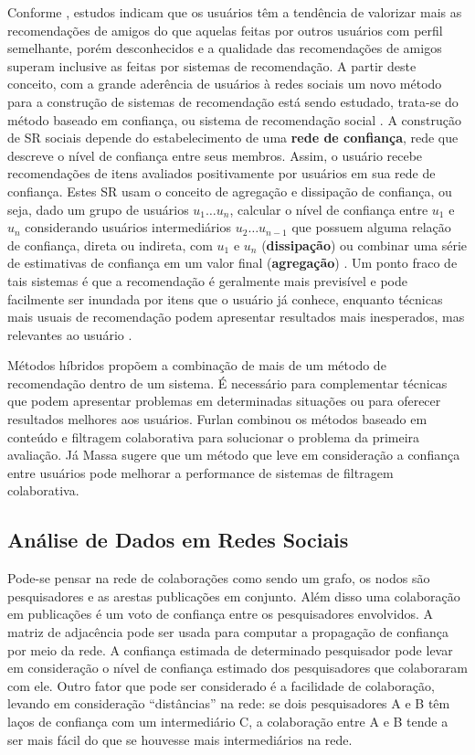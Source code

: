 \documentclass[12pt]{article}
\begin{document}
Conforme \cite{sinha2001comparing}, estudos indicam que os usuários têm a tendência de valorizar mais as recomendações de amigos do que aquelas feitas por outros usuários com perfil semelhante, porém desconhecidos e a qualidade das recomendações de amigos superam inclusive as feitas por sistemas de recomendação. A partir deste conceito, com a grande aderência de usuários à redes sociais um novo método para a construção de sistemas de recomendação está sendo estudado, trata-se do método baseado em confiança, ou sistema de recomendação social  \cite{ricci2011introduction}. A construção de SR sociais depende do estabelecimento de uma \textbf{rede de confiança}, rede que descreve o nível de confiança entre seus membros. Assim, o usuário recebe recomendações de itens avaliados positivamente por usuários em sua rede de confiança. Estes SR usam o conceito de agregação e dissipação de confiança, ou seja, dado um grupo de usuários $u_1  \dots u_n$, calcular o nível de confiança entre $u_1$ e $u_n$ considerando usuários intermediários $u_2 \dots u_{n-1}$ que possuem alguma relação de confiança, direta ou indireta, com $u_1$ e $u_n$ (\textbf{dissipação}) ou combinar uma série de estimativas de confiança em um valor final (\textbf{agregação}) \cite{victor2011trust}. Um ponto fraco de tais sistemas é que a recomendação é geralmente mais previsível e pode facilmente ser inundada por itens que o usuário já conhece, enquanto técnicas mais usuais de recomendação podem apresentar resultados mais inesperados, mas relevantes ao usuário \cite{sinha2001comparing}.

Métodos híbridos propõem a combinação de mais de um método de recomendação dentro de um sistema. É necessário para complementar técnicas que podem apresentar problemas em determinadas situações ou para oferecer resultados melhores aos usuários. Furlan \cite{da2018desenvolvimento} combinou os métodos baseado em conteúdo e filtragem colaborativa para solucionar o problema da primeira avaliação. Já Massa \cite{massa2004trust} sugere que um método que leve em consideração a confiança entre usuários pode melhorar a performance de sistemas de filtragem colaborativa.

\subsection{Análise de Dados em Redes Sociais}\label{sect:analysis}

Pode-se pensar na rede de colaborações como sendo um grafo, os nodos são pesquisadores e as arestas publicações em conjunto. Além disso uma colaboração em publicações é um voto de confiança entre os pesquisadores envolvidos. A matriz de adjacência pode ser usada para computar a propagação de confiança por meio da rede. A confiança estimada de determinado pesquisador pode levar em consideração o nível de confiança estimado dos pesquisadores que colaboraram com ele. Outro fator que pode ser considerado é a facilidade de colaboração, levando em  consideração “distâncias” na rede: se dois pesquisadores A e B têm laços de confiança com um intermediário C, a colaboração entre A e B tende a ser mais fácil do que se houvesse mais intermediários na rede.
\end{document}
